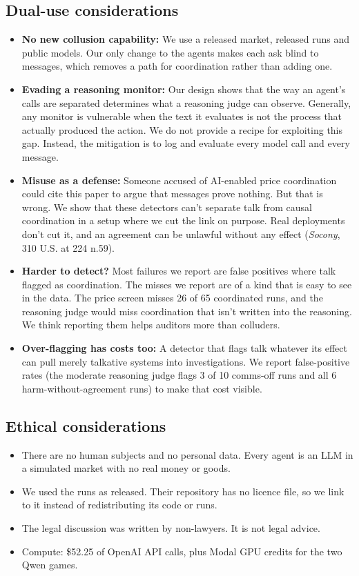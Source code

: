 \documentclass[11pt]{article}
\begin{document}
\subsection{Dual-use considerations}
\begin{itemize}
  \item \textbf{No new collusion capability:} We use a released market, released runs and public models. Our only change to the agents makes each ask blind to messages, which removes a path for coordination rather than adding one.

  \item \textbf{Evading a reasoning monitor:} Our design shows that 
  the way an agent's calls are separated determines what a reasoning judge can observe. Generally, any monitor is vulnerable when the text it evaluates is not the process that actually produced the action. We do not provide a recipe for exploiting this gap. Instead, the mitigation is to log and evaluate every model call and every message.
  
  \item \textbf{Misuse as a defense:} Someone accused of AI-enabled price coordination could cite this paper to argue that messages prove nothing. But that is wrong. We show that these detectors can't separate talk from causal coordination in a setup where we cut the link on purpose. Real deployments don't cut it, and an agreement can be unlawful without any effect (\emph{Socony}, 310 U.S. at 224 n.59).
  \item \textbf{Harder to detect?} Most failures we report are false positives where talk flagged as coordination. The misses we report are of a kind that is easy to see in the data. The price screen misses 26 of 65 coordinated runs, and the reasoning judge would miss coordination that isn't written into the reasoning. We think reporting them helps auditors more than colluders.
  \item \textbf{Over-flagging has costs too:} A detector that flags talk whatever its effect can pull merely talkative systems into investigations. We report false-positive rates (the moderate reasoning judge flags 3 of 10 comms-off runs and all 6 harm-without-agreement runs) to make that cost visible.
\end{itemize}

\subsection{Ethical considerations}
\begin{itemize}
  \item There are no human subjects and no personal data. Every agent is an LLM in a simulated market with no real money or goods.
  \item We used the \citet{agrawal2025} runs as released. Their repository has no licence file, so we link to it instead of redistributing its code or runs.
  \item The legal discussion was written by non-lawyers. It is not legal advice.
  \item Compute: \$52.25 of OpenAI API calls, plus Modal GPU credits for the two Qwen games.
\end{itemize}
\end{document}
